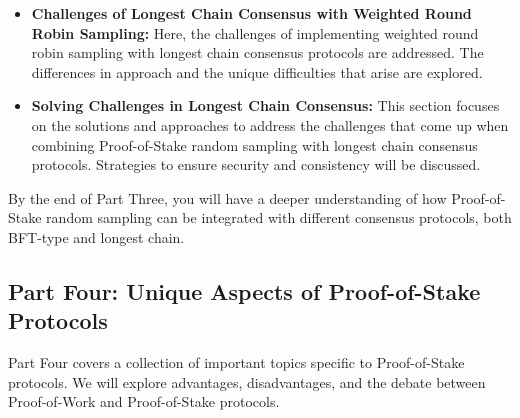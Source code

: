 \begin{enumerate}[label=(\arabic*)]
\begin{itemize}
      \item \textbf{Challenges of Longest Chain Consensus with Weighted Round Robin Sampling:} Here, the challenges of implementing weighted round robin sampling with longest chain consensus protocols are addressed. The differences in approach and the unique difficulties that arise are explored.
    
      \item \textbf{Solving Challenges in Longest Chain Consensus:} This section focuses on the solutions and approaches to address the challenges that come up when combining Proof-of-Stake random sampling with longest chain consensus protocols. Strategies to ensure security and consistency will be discussed.
    
    \end{itemize}

\end{enumerate}
By the end of Part Three, you will have a deeper understanding of how Proof-of-Stake random sampling can be integrated with different consensus protocols, both BFT-type and longest chain.

\subsection{Part Four: Unique Aspects of Proof-of-Stake Protocols}

Part Four covers a collection of important topics specific to Proof-of-Stake protocols. We will explore advantages, disadvantages, and the debate between Proof-of-Work and Proof-of-Stake protocols.

